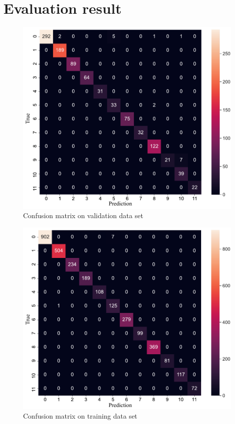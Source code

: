 \section{Evaluation result}
\label{sec:Evaluation result}
\begin{figure}[!ht]
    \centering
    \includegraphics[width=.85\textwidth]{evaluation/imgs/5-confusion_matrix_val.pdf}
    \caption{Confusion matrix on validation data set}
    \label{fig:5-confusion_matrix_val}
\end{figure}

\begin{figure}[!ht]
    \centering
    \includegraphics[width=.85\textwidth]{evaluation/imgs/5-confusion_matrix_train.pdf}
    \caption{Confusion matrix on training data set}
    \label{fig:5-confusion_matrix_train}
\end{figure}